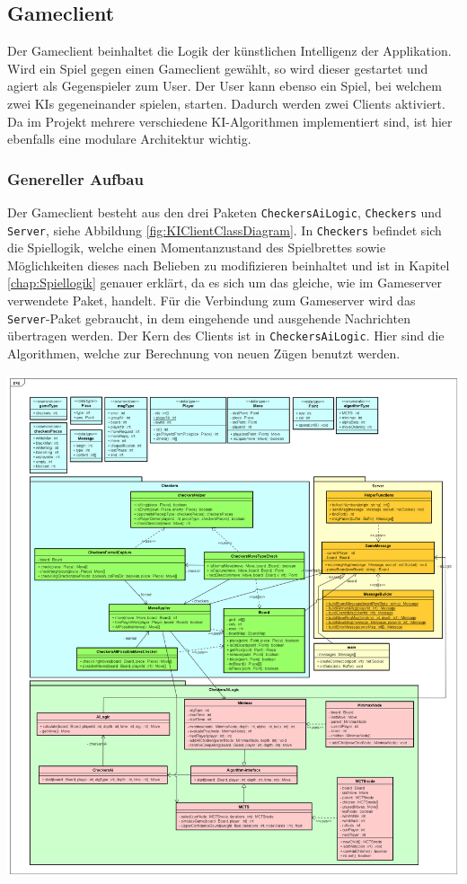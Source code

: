 \documentclass[12pt,a4paper,bibliography=totocnumbered,listof=totocnumbered]{article}
\begin{document}
\subsection{Gameclient}
Der Gameclient beinhaltet die Logik der künstlichen Intelligenz der Applikation. Wird ein Spiel gegen einen Gameclient gewählt, so wird dieser gestartet und agiert als 
Gegenspieler zum User. Der User kann ebenso ein Spiel, bei welchem zwei \ac{KI}s gegeneinander spielen, starten. Dadurch werden zwei Clients aktiviert.
Da im Projekt mehrere verschiedene \ac{KI}-Algorithmen implementiert sind, ist hier ebenfalls eine modulare Architektur wichtig.

\subsubsection{Genereller Aufbau}
Der Gameclient besteht aus den drei Paketen \texttt{CheckersAiLogic}, \texttt{Checkers} und \texttt{Server}, siehe Abbildung \ref{fig:KIClientClassDiagram}. 
In \texttt{Checkers} befindet sich die Spiellogik, welche einen Momentanzustand des Spielbrettes sowie Möglichkeiten dieses nach Belieben zu modifizieren beinhaltet 
und ist in Kapitel \ref{chap:Spiellogik} genauer erklärt, da es sich um das gleiche, wie im Gameserver verwendete Paket, handelt. 
Für die Verbindung zum Gameserver wird das \texttt{Server}-Paket gebraucht, in dem eingehende und ausgehende Nachrichten übertragen werden.
Der Kern des Clients ist in \texttt{CheckersAiLogic}. Hier sind die Algorithmen, welche zur Berechnung von neuen Zügen 
benutzt werden.

\vspace{1em}
\begin{minipage}{\linewidth}
	\centering
	\includegraphics[width=0.9\linewidth]{pics/GameClientClassDiagram.png}
	\label{fig:KIClientClassDiagram}
\end{minipage}
\end{document}
